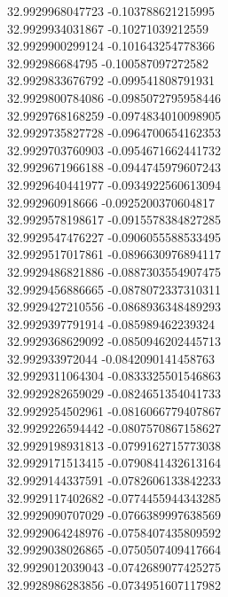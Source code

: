 {32.9929968047723	-0.103788621215995\\
32.9929934031867	-0.10271039212559\\
32.9929900299124	-0.101643254778366\\
32.992986684795	-0.100587097272582\\
32.9929833676792	-0.099541808791931\\
32.9929800784086	-0.0985072795958446\\
32.9929768168259	-0.0974834010098905\\
32.9929735827728	-0.0964700654162353\\
32.9929703760903	-0.0954671662441732\\
32.9929671966188	-0.0944745979607243\\
32.9929640441977	-0.0934922560613094\\
32.992960918666	-0.0925200370604817\\
32.9929578198617	-0.0915578384827285\\
32.9929547476227	-0.0906055588533495\\
32.9929517017861	-0.0896630976894117\\
32.9929486821886	-0.0887303554907475\\
32.9929456886665	-0.0878072337310311\\
32.9929427210556	-0.0868936348489293\\
32.9929397791914	-0.085989462239324\\
32.9929368629092	-0.0850946202445713\\
32.992933972044	-0.0842090141458763\\
32.9929311064304	-0.0833325501546863\\
32.9929282659029	-0.0824651354041733\\
32.9929254502961	-0.0816066779407867\\
32.9929226594442	-0.0807570867158627\\
32.9929198931813	-0.0799162715773038\\
32.9929171513415	-0.0790841432613164\\
32.9929144337591	-0.0782606133842233\\
32.9929117402682	-0.0774455944343285\\
32.9929090707029	-0.0766389997638569\\
32.9929064248976	-0.0758407435809592\\
32.9929038026865	-0.0750507409417664\\
32.9929012039043	-0.0742689077425275\\
32.9928986283856	-0.0734951607117982\\
}
